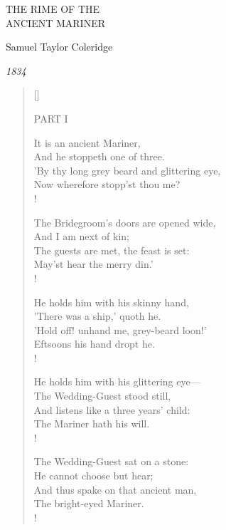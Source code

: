 \documentclass[11pt]{article}
\begin{document}
\thispagestyle{empty}

\vspace*{1.5in}

{\fontsize{24}{30}\selectfont\raggedright
THE RIME OF THE\\
ANCIENT MARINER}

\vspace{0.8in}

{\large\raggedright Samuel Taylor Coleridge}

\vspace{0.3in}

{\small\raggedright\itshape 1834}

\clearpage

\raggedright

\begin{verse}[\linewidth]

{\large PART I}

\bigskip

It is an ancient Mariner, \\
And he stoppeth one of three. \\
'By thy long grey beard and glittering eye, \\
Now wherefore stopp'st thou me? \\!

The Bridegroom's doors are opened wide, \\
And I am next of kin; \\
The guests are met, the feast is set: \\
May'st hear the merry din.' \\!

He holds him with his skinny hand, \\
'There was a ship,' quoth he. \\
'Hold off! unhand me, grey-beard loon!' \\
Eftsoons his hand dropt he. \\!

He holds him with his glittering eye— \\
The Wedding-Guest stood still, \\
And listens like a three years' child: \\
The Mariner hath his will. \\!

The Wedding-Guest sat on a stone: \\
He cannot choose but hear; \\
And thus spake on that ancient man, \\
The bright-eyed Mariner. \\!


\end{verse}
\end{document}
